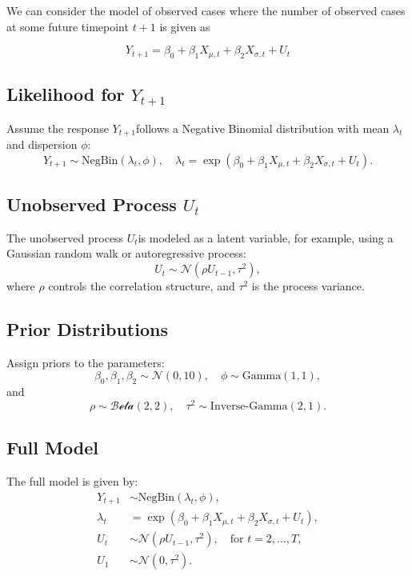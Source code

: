 \documentclass[
  letterpaper,
  DIV=11,
  numbers=noendperiod]{scrartcl}
\begin{document}
We can consider the model of observed cases where the number of observed
cases at some future timepoint \(t+1\) is given as

\begin{equation}
Y_{t+1} = \beta_0 + \beta_1 X_{\mu,t} + \beta_2 X_{\sigma, t} + U_t
\end{equation}

\subsection{\texorpdfstring{Likelihood for
\(Y_{t+1}\)}{Likelihood for Y\_\{t+1\}}}\label{likelihood-for-y_t1}

Assume the response \(Y_{t+1}\)follows a Negative Binomial distribution
with mean \(\lambda_t\)and dispersion \(\phi\): \begin{equation}
Y_{t+1} \sim \text{NegBin}(\lambda_t, \phi), \quad \lambda_t = \exp(\beta_0 + \beta_1 X_{\mu,t} + \beta_2 X_{\sigma,t} + U_t).
\end{equation}

\subsection{\texorpdfstring{Unobserved Process
\(U_t\)}{Unobserved Process U\_t}}\label{unobserved-process-u_t}

The unobserved process \(U_t\)is modeled as a latent variable, for
example, using a Gaussian random walk or autoregressive process:
\begin{equation}
U_t \sim \mathcal{N}(\rho U_{t-1}, \tau^2),
\end{equation} where \(\rho\) controls the correlation structure, and
\(\tau^2\) is the process variance.

\subsection{Prior Distributions}\label{prior-distributions}

Assign priors to the parameters: \begin{equation}
\beta_0, \beta_1, \beta_2 \sim \mathcal{N}(0, 10), \quad \phi \sim \text{Gamma}(1, 1),
\end{equation} and \begin{equation}
\rho \sim \mathcal{Beta}(2, 2), \quad \tau^2 \sim \text{Inverse-Gamma}(2, 1).
\end{equation}

\subsection{Full Model}\label{full-model}

The full model is given by: \begin{align*}
Y_{t+1} &\sim \text{NegBin}(\lambda_t, \phi), \\
\lambda_t &= \exp(\beta_0 + \beta_1 X_{\mu,t} + \beta_2 X_{\sigma,t} + U_t), \\
U_t &\sim \mathcal{N}(\rho U_{t-1}, \tau^2), \quad \text{for } t = 2, \ldots, T, \\
U_1 &\sim \mathcal{N}(0, \tau^2).
\end{align*}
\end{document}
